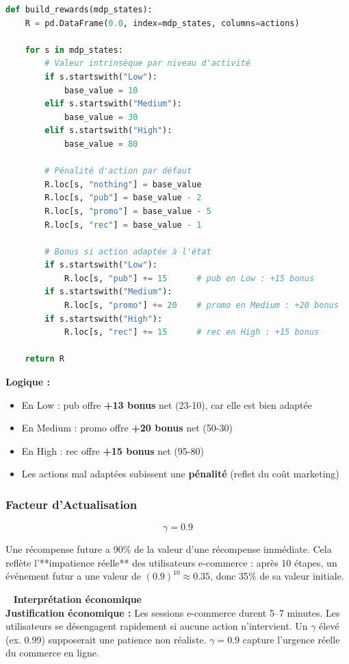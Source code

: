 \documentclass[11pt,a4paper]{article}
\newenvironment{insightbox}{%
  \vspace{3pt}\begin{framed}
  \noindent{\color{NavyBlue}\rule{0.3cm}{3pt}}~%
  \textcolor{NavyBlue}{\textbf{Interprétation économique}}\\[3pt]}
  {\end{framed}\vspace{3pt}}
\begin{document}
\begin{lstlisting}[language=Python]
def build_rewards(mdp_states):
    R = pd.DataFrame(0.0, index=mdp_states, columns=actions)
    
    for s in mdp_states:
        # Valeur intrinsèque par niveau d'activité
        if s.startswith("Low"):
            base_value = 10
        elif s.startswith("Medium"):
            base_value = 30
        elif s.startswith("High"):
            base_value = 80
        
        # Pénalité d'action par défaut
        R.loc[s, "nothing"] = base_value
        R.loc[s, "pub"] = base_value - 2
        R.loc[s, "promo"] = base_value - 5
        R.loc[s, "rec"] = base_value - 1
        
        # Bonus si action adaptée à l'état
        if s.startswith("Low"):
            R.loc[s, "pub"] += 15      # pub en Low : +15 bonus
        if s.startswith("Medium"):
            R.loc[s, "promo"] += 20    # promo en Medium : +20 bonus
        if s.startswith("High"):
            R.loc[s, "rec"] += 15      # rec en High : +15 bonus
    
    return R
\end{lstlisting}
 
\textbf{Logique :}
\begin{itemize}[leftmargin=1.5cm,itemsep=2pt]
  \item En Low : pub offre \textbf{+13 bonus} net (23-10), car elle est bien adaptée
  \item En Medium : promo offre \textbf{+20 bonus} net (50-30)
  \item En High : rec offre \textbf{+15 bonus} net (95-80)
  \item Les actions mal adaptées subissent une \textbf{pénalité} (reflet du coût marketing)
\end{itemize}
 
\subsubsection{Facteur d'Actualisation}
 
\[
  \gamma = 0.9
\]
 
Une récompense future a 90\% de la valeur d'une récompense immédiate.
Cela reflète l'**impatience réelle** des utilisateurs e-commerce :
après 10 étapes, un événement futur a une valeur de $(0.9)^{10} \approx 0.35$,
donc 35\% de sa valeur initiale.
 
\begin{insightbox}
\textbf{Justification économique :} Les sessions e-commerce durent 5--7 minutes.
Les utilisateurs se désengagent rapidement si aucune action n'intervient.
Un $\gamma$ élevé (ex. 0.99) supposerait une patience non réaliste.
$\gamma = 0.9$ capture l'urgence réelle du commerce en ligne.
\end{insightbox}
 
\end{document}
